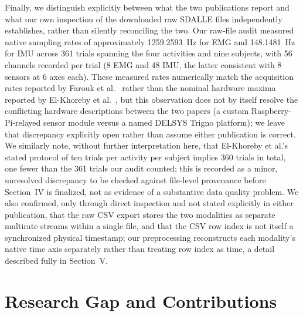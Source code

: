 \documentclass[conference]{IEEEtran}
\begin{document}
Finally, we distinguish explicitly between what the two publications
report and what our own inspection of the downloaded raw SDALLE
files independently establishes, rather than silently reconciling
the two. Our raw-file audit measured native sampling rates of
approximately 1259.2593~Hz for EMG and 148.1481~Hz for IMU across
361 trials spanning the four activities and nine subjects, with 56
channels recorded per trial (8 EMG and 48 IMU, the latter consistent
with 8 sensors at 6 axes each). These measured rates numerically
match the acquisition rates reported by Farouk et
al.~\cite{farouk2026sdalle} rather than the nominal hardware maxima
reported by El-Khoreby et al.~\cite{el-khoreby2025sdalle}, but this
observation does not by itself resolve the conflicting hardware
descriptions between the two papers (a custom Raspberry-Pi-relayed
sensor module versus a named DELSYS Trigno platform); we leave that
discrepancy explicitly open rather than assume either publication is
correct. We similarly note, without further interpretation here,
that El-Khoreby et al.'s stated protocol of ten trials per activity
per subject implies 360 trials in total, one fewer than the 361
trials our audit counted; this is recorded as a minor, unresolved
discrepancy to be checked against file-level provenance before
Section~IV is finalized, not as evidence of a substantive data
quality problem. We also confirmed, only through direct inspection
and not stated explicitly in either publication, that the raw CSV
export stores the two modalities as separate multirate streams
within a single file, and that the CSV row index is not itself a
synchronized physical timestamp; our preprocessing reconstructs each
modality's native time axis separately rather than treating row
index as time, a detail described fully in Section~V.

\section{Research Gap and Contributions}
\label{sec:gap-contributions}
\end{document}
